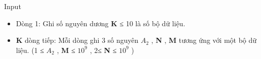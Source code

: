 Input
\begin{itemize}
	\item Dòng 1: Ghi số nguyên dương \textbf{ K } ≤ 10 là số bộ dữ liệu.
	\item \textbf{K } dòng tiếp: Mỗi dòng ghi 3 số nguyên $A_{2}$ , \textbf{ N } , \textbf{ M } tương ứng với một bộ dữ liệu. (1 ≤ $A_{2}$ , \textbf{ M } ≤ $10^{9}$ , 2≤ \textbf{ N } ≤ $10^{9}$ )
\end{itemize}